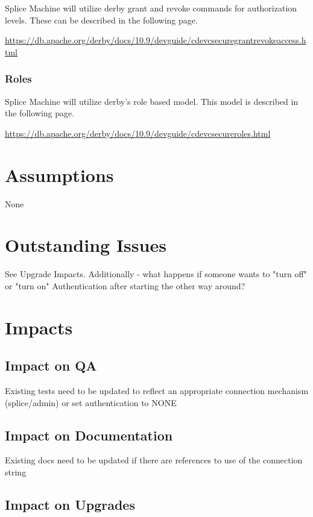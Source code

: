 \documentclass{article}
\begin{document}
Splice Machine will utilize derby grant and revoke commands for
authorization levels.  These can be described in the following page.

\url{https://db.apache.org/derby/docs/10.9/devguide/cdevcsecuregrantrevokeaccess.html}

\subsubsection{Roles}

Splice Machine will utilize derby's role based model.  This model is described
in the following page.

\url{https://db.apache.org/derby/docs/10.9/devguide/cdevcsecureroles.html}


\section{Assumptions}

None

\section{Outstanding Issues}

See Upgrade Impacts.  Additionally - what happens if someone wants to "turn off" or "turn on" Authentication after starting the other way around?

\section{Impacts}

\subsection{Impact on QA}

Existing tests need to be updated to reflect an appropriate connection mechanism (splice/admin) or set authentication to NONE

\subsection{Impact on Documentation} 

Existing docs need to be updated if there are references to use of the connection string

\subsection{Impact on Upgrades}
\end{document}

